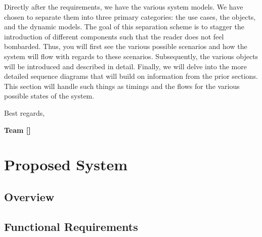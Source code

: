 \documentclass[12pt,letterpaper]{article}
\begin{document}
Directly after the requirements, we have the various system models. We have chosen to separate them into three
primary categories: the use cases, the objects, and the dynamic models. The goal of this separation scheme is to
stagger the introduction of different components such that the reader does not feel bombarded. Thus, you will 
first see the various possible scenarios and how the system will flow with regards to these scenarios. Subsequently, 
the various objects will be introduced and described in detail. Finally, we will delve into the more detailed sequence 
diagrams that will build on information from the prior sections. This section will handle such things as timings and
the flows for the various possible states of the system.

\vspace{1em}

\noindent Best regards,

\vspace{1em}

\textbf{Team [\teamname{}]}

\newpage{}

\section{Proposed System}

\subsection{Overview}


\subsection{Functional Requirements}
\end{document}
